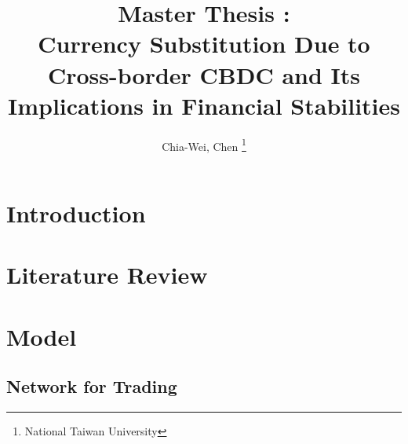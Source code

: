 \documentclass[11pt, a4paper]{article}
\title{Master Thesis : \\
Currency Substitution Due to Cross-border CBDC and Its Implications in Financial Stabilities}
\author{Chia-Wei, Chen \thanks{National Taiwan University}}
\theoremstyle{definition}
\begin{document}
    \maketitle
    \begin{abstract}
        
    \end{abstract}


    \section{Introduction}
    
    \section{Literature Review}
    
    \section{Model}
    


    
    

    \newpage
    \begin{appendices}
        \section{Network for Trading} \label{sec-network}
    \end{appendices}
\end{document}

